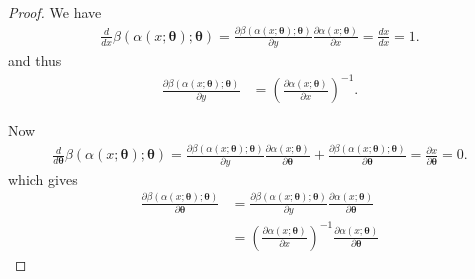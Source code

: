 \begin{proof}
    We have
    \begin{align}
        \frac{d}{d x} \beta(\alpha(x; \bm \theta); \bm \theta) = \frac{\partial \beta(\alpha(x; \bm \theta); \bm \theta)}{\partial y} \frac{\partial \alpha(x; \bm \theta)}{\partial x} = \frac{d x}{d x} = 1.
    \end{align}
    and thus
    \begin{align}
        \frac{\partial \beta(\alpha(x; \bm \theta); \bm \theta)}{\partial y}  &= \left( \frac{\partial \alpha(x; \bm \theta)}{\partial x} \right)^{-1}.
    \end{align}
    
    Now 
    \begin{align}
        \frac{d}{d \bm \theta} \beta(\alpha(x; \bm \theta); \bm \theta) = \frac{\partial \beta(\alpha(x; \bm \theta); \bm \theta)}{\partial y} \frac{\partial \alpha(x; \bm \theta)}{\partial \bm \theta} + \frac{\partial \beta(\alpha(x; \bm \theta); \bm \theta)}{\partial \bm \theta} = \frac{\partial x}{\partial \bm \theta} = 0.
    \end{align}
    which gives
    \begin{align}
        \frac{\partial \beta(\alpha(x; \bm \theta); \bm \theta)}{\partial \bm \theta} 
        &= \frac{\partial \beta(\alpha(x; \bm \theta); \bm \theta)}{\partial y} \frac{\partial \alpha(x; \bm \theta)}{\partial \bm \theta}\\
        &= \left( \frac{\partial \alpha(x; \bm \theta)}{\partial x} \right)^{-1} \frac{\partial \alpha(x; \bm \theta)}{\partial \bm \theta}
    \end{align}
    

\end{proof}
